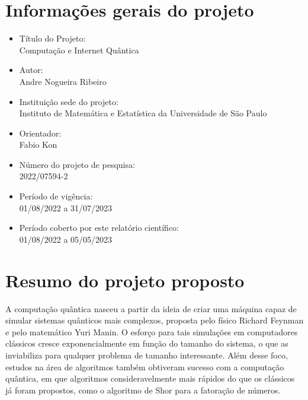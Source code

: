 \documentclass{article}
\begin{document}
\section{Informações gerais do projeto}
    \begin{itemize}
        \item \large Título do Projeto: \\ Computação e Internet Quântica 
    \end{itemize}
    \begin{itemize}
        \item \large Autor: \\
        Andre Nogueira Ribeiro
    \end{itemize}
    \begin{itemize}
        \item \large Instituição sede do projeto: \\
        Instituto de Matemática e Estatística da Universidade de São Paulo
    \end{itemize}
    \begin{itemize}
        \item \large Orientador: \\
        Fabio Kon
    \end{itemize}
    \begin{itemize}
        \item \large Número do projeto de pesquisa:\\
        2022/07594-2 
    \end{itemize}
    \begin{itemize}
        \item \large Período de vigência: \\
        01/08/2022 a 31/07/2023 
    \end{itemize}
    \begin{itemize}
        \item \large Período coberto por este relatório científico: \\
        01/08/2022 a 05/05/2023 
    \end{itemize}
    
    \newpage

\section{Resumo do projeto proposto}
    
    A computação quântica nasceu a partir da ideia de criar uma máquina capaz de simular sistemas quânticos mais complexos, proposta pelo físico Richard Feynman e pelo matemático Yuri Manin. O esforço para tais simulações em computadores clássicos cresce exponencialmente em função do tamanho do sistema, o que as inviabiliza para qualquer problema de tamanho interessante. Além desse foco, estudos na área de algoritmos também obtiveram sucesso com a computação quântica, em que algoritmos consideravelmente mais rápidos do que os clássicos já foram propostos, como o algoritmo de Shor para a fatoração de números.
    
\end{document}
